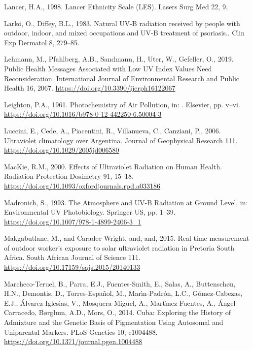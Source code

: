 \documentclass[10pt]{article}
\begin{document}
\label{csl:45}Lancer, H.A., 1998. {Lancer Ethnicity Scale (LES)}. Lasers Surg Med 22, 9.

\label{csl:50}Larkö, O., Diffey, B.L., 1983. {Natural UV-B radiation received by people with outdoor, indoor, and mixed occupations and UV-B treatment of psoriasis.}. Clin Exp Dermatol 8, 279–85.

\label{csl:32}Lehmann, M., Pfahlberg, A.B., Sandmann, H., Uter, W., Gefeller, O., 2019. {Public Health Messages Associated with Low {UV} Index Values Need Reconsideration}. International Journal of Environmental Research and Public Health 16, 2067. \url{https://doi.org/10.3390/ijerph16122067}

\label{csl:9}Leighton, P.A., 1961. {Photochemistry of Air Pollution}, in: . Elsevier, pp. v--vi. \url{https://doi.org/10.1016/b978-0-12-442250-6.50004-3}

\label{csl:57}Luccini, E., Cede, A., Piacentini, R., Villanueva, C., Canziani, P., 2006. {Ultraviolet climatology over Argentina}. Journal of Geophysical Research 111. \url{https://doi.org/10.1029/2005jd006580}

\label{csl:33}MacKie, R.M., 2000. {Effects of Ultraviolet Radiation on Human Health}. Radiation Protection Dosimetry 91, 15–18. \url{https://doi.org/10.1093/oxfordjournals.rpd.a033186}

\label{csl:54}Madronich, S., 1993. {The Atmosphere and {UV}-B Radiation at Ground Level}, in: Environmental {UV} Photobiology. Springer {US}, pp. 1–39. \url{https://doi.org/10.1007/978-1-4899-2406-3_1}

\label{csl:51}Makgabutlane, M., and Caradee Wright, and, and, 2015. {Real-time measurement of outdoor worker's exposure to solar ultraviolet radiation in Pretoria South Africa}. South African Journal of Science 111. \url{https://doi.org/10.17159/sajs.2015/20140133}

\label{csl:47}Marcheco-Teruel, B., Parra, E.J., Fuentes-Smith, E., Salas, A., Buttensch{\o}n, H.N., Demontis, D., Torres-Espa{\~{n}}ol, M., Mar{\'{\i}}n-Padr{\'{o}}n, L.C., G{\'{o}}mez-Cabezas, E.J., {\'{A}}lvarez-Iglesias, V., Mosquera-Miguel, A., Mart{\'{\i}}nez-Fuentes, A., {\'{A}}ngel Carracedo, B{\o}rglum, A.D., Mors, O., 2014. {Cuba: Exploring the History of Admixture and the Genetic Basis of Pigmentation Using Autosomal and Uniparental Markers}. {PLoS} Genetics 10, e1004488. \url{https://doi.org/10.1371/journal.pgen.1004488}
\end{document}
